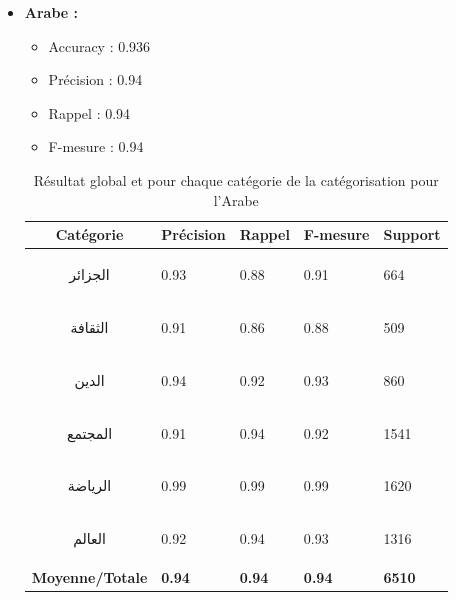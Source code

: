 \begin{itemize}
\begin{table}[H]
                    \caption{Résultat global et pour chaque catégorie de la catégorisation pour l'Anglais}
            \end{table}
            \item{\textbf{Arabe :}}
            \begin{itemize}
                \item{Accuracy : 0.936}
                \item{Précision : 0.94}
                \item{Rappel : 0.94}
                \item{F-mesure : 0.94}
            \end{itemize}
            \begin{table}[H]
                    \begin{center}
                        \begin{tabular}{|c|C{2cm}|C{2cm}|C{2cm}|C{2cm}|}
                            \hline
                            \textbf{Catégorie} &  \textbf{Précision} &  \textbf{Rappel} &  \textbf{F-mesure} &  \textbf{Support} \\
                            \hline
                            \begin{arab}الجزائر\end{arab} & 0.93 & 0.88 & 0.91 & 664 \\
                            \hline
                            \begin{arab}الثقافة\end{arab} & 0.91 & 0.86 & 0.88 & 509 \\
                            \hline
                            \begin{arab}الدين\end{arab} & 0.94 & 0.92 & 0.93 & 860 \\
                            \hline
                            \begin{arab}المجتمع\end{arab} & 0.91 & 0.94 & 0.92 & 1541 \\
                            \hline
                            \begin{arab}الرياضة\end{arab} & 0.99 & 0.99 & 0.99 & 1620 \\
                            \hline
                            \begin{arab}العالم\end{arab} & 0.92 & 0.94 & 0.93 & 1316 \\
                            \hline                            
                            \textbf{Moyenne/Totale} & \textbf{0.94} & \textbf{0.94} & \textbf{0.94} & \textbf{6510} \\
                            \hline
                        \end{tabular}
                    \end{center}
                    \caption{Résultat global et pour chaque catégorie de la catégorisation pour l'Arabe}
                \end{table}
        \end{itemize}

